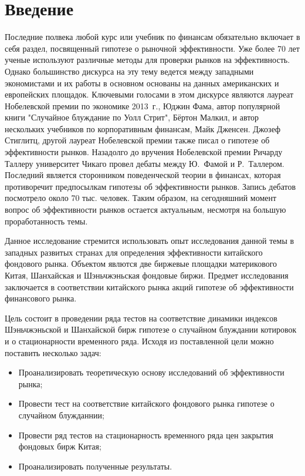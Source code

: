 \documentclass[a4paper,12pt]{article}
\begin{document}
\newpage
\tableofcontents
\thispagestyle{empty}
\newpage
\section{Введение}

Последние полвека любой курс или учебник по финансам обязательно включает в себя раздел, посвященный гипотезе о рыночной эффективности. Уже более 70 лет ученые используют различные методы для проверки рынков на эффективность. Однако большинство дискурса на эту тему ведется между западными экономистами и их работы в основном основаны на данных американских и европейских площадок. Ключевыми голосами в этом дискурсе являются лауреат Нобелевской премии по экономике 2013~г., Юджин Фама, автор популярной книги "Случайное блуждание по Уолл Стрит", Бёртон Малкил, и автор нескольких учебников по корпоративным финансам, Майк Дженсен. Джозеф Стиглитц, другой лауреат Нобелевской премии также писал о гипотезе об эффективности рынков. Назадолго до вручения Нобелевской премии Ричарду Таллеру университет Чикаго провел дебаты между Ю.~Фамой и Р.~Таллером. Последний является сторонником поведенческой теории в финансах, которая противоречит предпосылкам гипотезы об эффективности рынков. Запись дебатов посмотрело около 70 тыс. человек. Таким образом, на сегодняшний момент вопрос об эффективности рынков остается актуальным, несмотря на большую проработанность темы.

Данное исследование стремится использовать опыт исследования данной темы в западных развитых странах для определения эффективности китайского фондового рынка. Объектом явлются две биржевые площадки материкового Китая, Шанхайская и Шэньчжэньская фондовые биржи. Предмет исследования заключается в соответствии китайского рынка акций гипотезе об эффективности финансового рынка.

Цель состоит в проведении ряда тестов на соответствие динамики индексов Шэньчжэньской и Шанхайской бирж гипотезе о случайном блуждании котировок и о стационарности временного ряда. Исходя из поставленной цели можно поставить несколько задач:
\begin{itemize}
  \item Проанализировать теоретическую основу исследований об эффективности рынка;
  \item Провести тест на соответствие китайского фондового рынка гипотезе о случайном блужданнии;
  \item Провести ряд тестов на стационарность временного ряда цен закрытия фондовых бирж Китая;
  \item Проанализировать полученные результаты.
\end{itemize}
\end{document}
